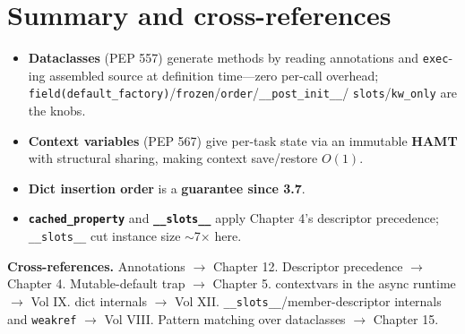 \section{Summary and cross-references}

\begin{itemize}
  \item \textbf{Dataclasses} (PEP 557) generate methods by reading annotations and \texttt{exec}-ing
    assembled source at definition time---zero per-call overhead;
    \texttt{field(default\_factory)}/\texttt{frozen}/\texttt{order}/\texttt{\_\_post\_init\_\_}/
    \texttt{slots}/\texttt{kw\_only} are the knobs.
  \item \textbf{Context variables} (PEP 567) give per-task state via an immutable \textbf{HAMT} with
    structural sharing, making context save/restore $O(1)$.
  \item \textbf{Dict insertion order} is a \textbf{guarantee since 3.7}.
  \item \textbf{\texttt{cached\_property}} and \textbf{\texttt{\_\_slots\_\_}} apply Chapter 4's
    descriptor precedence; \texttt{\_\_slots\_\_} cut instance size $\sim$7$\times$ here.
\end{itemize}

\textbf{Cross-references.} Annotations $\rightarrow$ Chapter 12. Descriptor precedence $\rightarrow$
Chapter 4. Mutable-default trap $\rightarrow$ Chapter 5. contextvars in the async runtime
$\rightarrow$ Vol IX. dict internals $\rightarrow$ Vol XII. \texttt{\_\_slots\_\_}/member-descriptor
internals and \texttt{weakref} $\rightarrow$ Vol VIII. Pattern matching over dataclasses
$\rightarrow$ Chapter 15.
